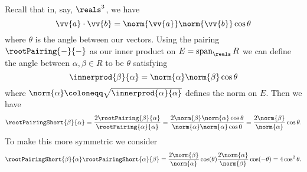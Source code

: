 \documentclass[fleqn]{NotesClass}
\DeclareMathOperator{\Span}{span}
\begin{document}
    Recall that in, say, \(\reals^3\), we have
    \begin{equation}
        \vv{a} \cdot \vv{b} = \norm{\vv{a}} \norm{\vv{b}} \cos \theta
    \end{equation}
    where \(\theta\) is the angle between our vectors.
    Using the pairing \(\rootPairing{-}{-}\) as our inner product on \(E = \Span_{\reals} R\) we can define the angle between \(\alpha, \beta \in R\) to be \(\theta\) satisfying
    \begin{equation}
        \innerprod{\beta}{\alpha} = \norm{\alpha} \norm{\beta} \cos \theta
    \end{equation}
    where \(\norm{\alpha} \coloneqq \sqrt{\innerprod{\alpha}{\alpha}}\) defines the norm on \(E\).
    Then we have
    \begin{equation}
        \rootPairingShort{\beta}{\alpha} = \frac{2\rootPairing{\beta}{\alpha}}{\rootPairing{\alpha}{\alpha}} = \frac{2\norm{\beta}\norm{\alpha} \cos \theta}{\norm{\alpha} \norm{\alpha} \cos 0} = \frac{2\norm{\beta}}{\norm{\alpha}} \cos \theta.
    \end{equation}
    To make this more symmetric we consider
    \begin{equation}
        \rootPairingShort{\beta}{\alpha} \rootPairingShort{\alpha}{\beta} = \frac{2\norm{\beta}}{\norm{\alpha}} \cos (\theta) \frac{2 \norm{\alpha}}{\norm{\beta}} \cos(-\theta) = 4\cos^2\theta.
    \end{equation}
    
\end{document}
